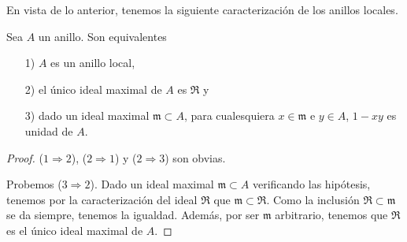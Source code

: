 \documentclass[./main.tex]{subfiles}
\begin{document}
	En vista de lo anterior, tenemos la siguiente caracterización de los anillos locales.
	\begin{proposition}
		Sea $A$ un anillo. Son equivalentes
		\begin{itemize}
			\item[1)] $A$ es un anillo local,
			\item[2)] el único ideal maximal de $A$ es $\mathfrak R$ y
			\item[3)] dado un ideal maximal $\mathfrak m\subset A$, para cualesquiera $x\in\mathfrak m$ e $y\in A$, $1-xy$ es unidad de $A$.
		\end{itemize}
	\end{proposition}
	\begin{proof}
		
		
		($1\Rightarrow2$), ($2\Rightarrow1$) y ($2\Rightarrow 3$) son obvias.
		
		Probemos ($3\Rightarrow2$). Dado un ideal maximal $\mathfrak m\subset A$ verificando las hipótesis, tenemos por la caracterización del ideal $\mathfrak R$ que $\mathfrak m\subset \mathfrak R$. Como la inclusión $\mathfrak R\subset \mathfrak m$ se da siempre, tenemos la igualdad. Además, por ser $\mathfrak m$ arbitrario, tenemos que $\mathfrak R$ es el único ideal maximal de $A$.
	\end{proof}
	
\end{document}

